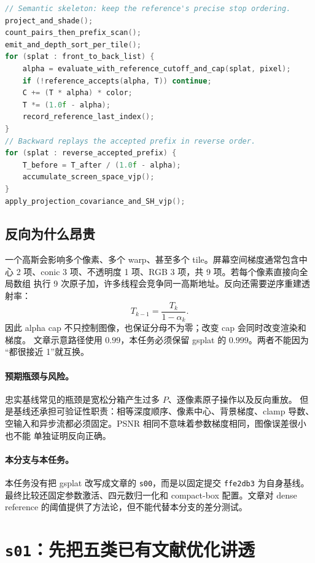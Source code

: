 \begin{lstlisting}[language=C++,basicstyle=\ttfamily\small,breaklines=true]
// Semantic skeleton: keep the reference's precise stop ordering.
project_and_shade();
count_pairs_then_prefix_scan();
emit_and_depth_sort_per_tile();
for (splat : front_to_back_list) {
    alpha = evaluate_with_reference_cutoff_and_cap(splat, pixel);
    if (!reference_accepts(alpha, T)) continue;
    C += (T * alpha) * color;
    T *= (1.0f - alpha);
    record_reference_last_index();
}
// Backward replays the accepted prefix in reverse order.
for (splat : reverse_accepted_prefix) {
    T_before = T_after / (1.0f - alpha);
    accumulate_screen_space_vjp();
}
apply_projection_covariance_and_SH_vjp();
\end{lstlisting}

\subsection{反向为什么昂贵}

一个高斯会影响多个像素、多个 warp、甚至多个 tile。屏幕空间梯度通常包含中心
2 项、conic 3 项、不透明度 1 项、RGB 3 项，共 9 项。若每个像素直接向全局数组
执行 9 次原子加，许多线程会竞争同一高斯地址。反向还需要逆序重建透射率：
\begin{equation}
 T_{k-1}=\frac{T_k}{1-\alpha_k}.
\end{equation}
因此 alpha cap 不只控制图像，也保证分母不为零；改变 cap 会同时改变渲染和梯度。
文章示意路径使用 $0.99$，本任务必须保留 gsplat 的 $0.999$。两者不能因为
``都很接近 1''就互换。

\paragraph{预期瓶颈与风险。}
忠实基线常见的瓶颈是宽松分箱产生过多 $P$、逐像素原子操作以及反向重放。
但是基线还承担可验证性职责：相等深度顺序、像素中心、背景梯度、clamp 导数、
空输入和异步流都必须固定。PSNR 相同不意味着参数梯度相同，图像误差很小也不能
单独证明反向正确。

\paragraph{本分支与本任务。}
本任务没有把 gsplat 改写成文章的 \texttt{s00}，而是以固定提交
\texttt{ffe2db3} 为自身基线。最终比较还固定参数激活、四元数归一化和 compact-box
配置。文章对 dense reference 的阈值提供了方法论，但不能代替本分支的差分测试。

\section{\texttt{s01}：先把五类已有文献优化讲透}

